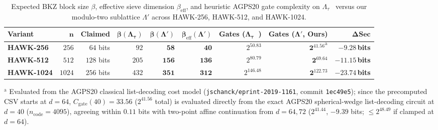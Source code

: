 \documentclass[11pt,a4paper]{article}
\theoremstyle{definition}
\newcommand{\Lt}{\Lambda_\tau}
\newcommand{\Lp}{\Lambda'}
\begin{document}
\begin{table}[t]
\centering
\footnotesize
\caption{Expected BKZ block size $\beta$, effective sieve dimension $\beta_{\mathrm{eff}}$, and heuristic AGPS20 gate complexity on $\Lt$~\cite[Appendix~C]{SW26} versus our modulo-two sublattice $\Lp$ across HAWK-256, HAWK-512, and HAWK-1024.}
\label{tab:extrap}
\setlength{\tabcolsep}{2.5pt}
\begin{tabular}{@{}lrrrrrrrr@{}}
\toprule
\textbf{Variant} & $\boldsymbol{n}$ & \textbf{Claimed} & $\boldsymbol{\beta(\Lt)}$ & $\boldsymbol{\beta(\Lp)}$ & $\boldsymbol{\beta_{\mathrm{eff}}(\Lp)}$ & \textbf{Gates ($\boldsymbol{\Lt}$~\cite{SW26})} & \textbf{Gates ($\boldsymbol{\Lp}$, Ours)} & $\boldsymbol{\Delta\textbf{Sec}}$ \\
\midrule
\textbf{HAWK-256}  & $256$  & $64$ bits  & $92$  & $\mathbf{58}$  & $\mathbf{40}$  & $2^{50.83}$  & $\mathbf{2^{41.56}}^{\mathrm{a}}$ & $\mathbf{-9.28}$\,\textbf{bits} \\
\textbf{HAWK-512}  & $512$  & $128$ bits & $205$ & $\mathbf{156}$ & $\mathbf{136}$ & $2^{80.79}$  & $\mathbf{2^{69.64}}$ & $\mathbf{-11.15}$\,\textbf{bits} \\
\textbf{HAWK-1024} & $1024$ & $256$ bits & $432$ & $\mathbf{351}$ & $\mathbf{312}$ & $2^{146.48}$ & $\mathbf{2^{122.73}}$ & $\mathbf{-23.74}$\,\textbf{bits} \\
\bottomrule
\end{tabular}
\par\smallskip
{\scriptsize $^{\mathrm{a}}$ Evaluated from the AGPS20 classical list-decoding cost model (\texttt{jschanck/eprint-2019-1161}, commit \texttt{1ec49e5}); since the precomputed CSV starts at $d=64$, $C_{\mathrm{gate}}(40)=33.56$ ($2^{41.56}$ total) is evaluated directly from the exact AGPS20 spherical-wedge list-decoding circuit at $d=40$ ($n_{\mathrm{code}}=4095$), agreeing within $0.11$ bits with two-point affine continuation from $d=64,72$ ($2^{41.44}$, $-9.39$ bits; $\le 2^{48.49}$ if clamped at $d=64$).}
\end{table}
\end{document}
